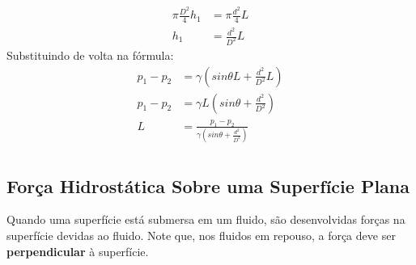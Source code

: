 \documentclass{article}
\begin{document}
\begin{align*}
     \pi \frac{D^2}{4}h_1&=\pi \frac{d^2}{4}L\\
     h_1&=\frac{d^2}{D^2}L
\end{align*}
Substituindo de volta na fórmula:
\begin{align*}
     p_1-p_2&=\gamma\left(sin\theta L + \frac{d^2}{D^2}L\right)\\
     p_1-p_2&=\gamma L\left(sin\theta + \frac{d^2}{D^2}\right)\\
     L&=\frac{p_1-p_2}{\gamma\left(sin\theta + \frac{d^2}{D^2}\right)}\\
\end{align*}


\subsection{Força Hidrostática Sobre uma Superfície Plana}
Quando uma superfície está submersa em um fluido, são desenvolvidas forças na superfície devidas ao fluido. Note que, nos fluidos em repouso, a força deve ser \textbf{perpendicular} à superfície. 
\end{document}

